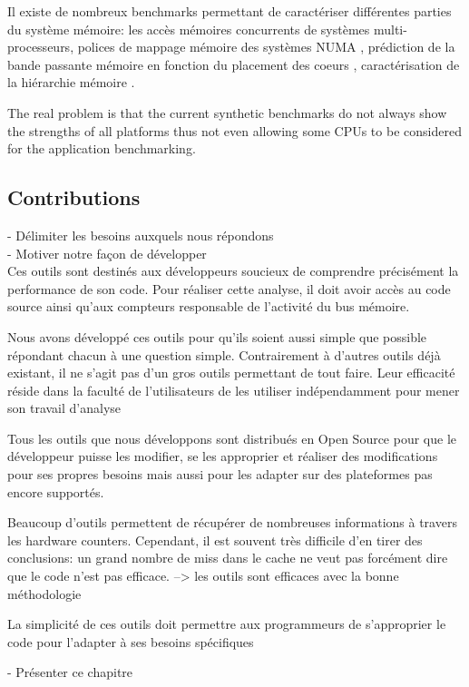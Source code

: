    Il existe de nombreux benchmarks permettant de caractériser différentes parties du système mémoire: les accès mémoires concurrents de systèmes multi-processeurs\cite{Mandal2010}, polices de mappage mémoire des systèmes NUMA \cite{Diener2015}, prédiction de la bande passante mémoire en fonction du placement des coeurs \cite{Wang2016a}, caractérisation de la hiérarchie mémoire \cite{Cooper2011}.
    
    The real problem is that the current synthetic benchmarks do not always show the strengths of all platforms thus not even allowing some CPUs to be considered for the application benchmarking.
    
    
\subsection{Contributions}

- Délimiter les besoins auxquels nous répondons\\
- Motiver notre façon de développer\\

    Ces outils sont destinés aux développeurs soucieux de comprendre précisément la performance de son code. Pour réaliser cette analyse, il doit avoir accès au code source ainsi qu'aux compteurs responsable de l’activité du bus mémoire.
    
    Nous avons développé ces outils pour qu'ils soient aussi simple que possible répondant chacun à une question simple. Contrairement à d’autres outils déjà existant, il ne s'agit pas d’un gros outils permettant de tout faire. Leur efficacité réside dans la faculté de l’utilisateurs de les utiliser indépendamment pour mener son travail d'analyse

    Tous les outils que nous développons sont distribués en Open Source pour que le développeur puisse les modifier, se les approprier et réaliser des modifications pour ses propres besoins mais aussi pour les adapter sur des plateformes pas encore supportés.
    
    Beaucoup d’outils permettent de récupérer de nombreuses informations à travers les hardware counters. Cependant, il est souvent très difficile d’en tirer des conclusions: un grand nombre de miss dans le cache ne veut pas forcément dire que le code n’est pas efficace.
            --> les outils sont efficaces avec la bonne méthodologie
     
    La simplicité de ces outils doit permettre aux programmeurs de s’approprier le code pour l’adapter à ses besoins spécifiques 
    
    - Présenter ce chapitre\\
